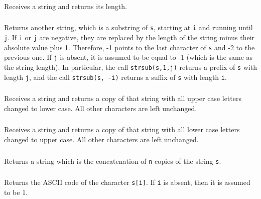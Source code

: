 \subsubsection*{\ff {}}
Receives a string and returns its length.

\subsubsection*{\ff {}}
Returns another string, which is a substring of \verb|s|,
starting at \verb|i|  and running until \verb|j|.
If \verb|i| or \verb|j| are negative,
they are replaced by the length of the string minus their
absolute value plus 1.
Therefore, -1 points to the last character of \verb|s|
and -2 to the previous one.
If \verb|j| is absent, it is assumed to be equal to -1
(which is the same as the string length).
In particular,
the call \verb|strsub(s,1,j)| returns a prefix of \verb|s|
with length \verb|j|,
and the call \verb|strsub(s, -i)| returns a suffix of \verb|s|
with length \verb|i|.

\subsubsection*{\ff {}}
Receives a string and returns a copy of that string with all
upper case letters changed to lower case.
All other characters are left unchanged.

\subsubsection*{\ff {}}
Receives a string and returns a copy of that string with all
lower case letters changed to upper case.
All other characters are left unchanged.

\subsubsection*{\ff {}}
Returns a string which is the concatenation of \verb|n| copies of
the string \verb|s|.

\subsubsection*{\ff {}}
Returns the ASCII code of the character \verb|s[i]|.
If \verb|i| is absent, then it is assumed to be 1.


